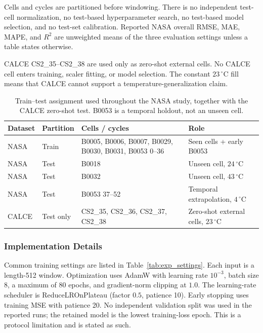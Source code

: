 Cells and cycles are partitioned before windowing. There is no independent test-cell normalization, no test-based hyperparameter search, no test-based model selection, and no test-set calibration. Reported NASA overall RMSE, MAE, MAPE, and $R^2$ are unweighted means of the three evaluation settings unless a table states otherwise.

CALCE CS2\_35--CS2\_38 are used only as zero-shot external cells. No CALCE cell enters training, scaler fitting, or model selection. The constant $23\,^\circ$C fill means that CALCE cannot support a temperature-generalization claim.

\begin{table}[htbp]
\centering
\footnotesize
\caption{Train--test assignment used throughout the NASA study, together with the CALCE zero-shot test. B0053 is a temporal holdout, not an unseen cell.}\label{tab:exp_split}
\begin{tabular*}{\textwidth}{@{}LLLL@{}}
\toprule
Dataset & Partition & Cells / cycles & Role \\
\midrule
NASA & Train & B0005, B0006, B0007, B0029, B0030, B0031, B0053 0--36 & Seen cells + early B0053 \\
NASA & Test & B0018 & Unseen cell, $24\,^\circ$C \\
NASA & Test & B0032 & Unseen cell, $43\,^\circ$C \\
NASA & Test & B0053 37--52 & Temporal extrapolation, $4\,^\circ$C \\
CALCE & Test only & CS2\_35, CS2\_36, CS2\_37, CS2\_38 & Zero-shot external cells, $23\,^\circ$C \\
\bottomrule
\end{tabular*}
\end{table}

\subsubsection{Implementation Details}
\label{sec:implementation_details}

Common training settings are listed in Table~\ref{tab:exp_settings}. Each input is a length-512 window. Optimization uses AdamW with learning rate $10^{-3}$, batch size 8, a maximum of 80 epochs, and gradient-norm clipping at $1.0$. The learning-rate scheduler is ReduceLROnPlateau (factor $0.5$, patience 10). Early stopping uses training MSE with patience 20. No independent validation split was used in the reported runs; the retained model is the lowest training-loss epoch. This is a protocol limitation and is stated as such.

